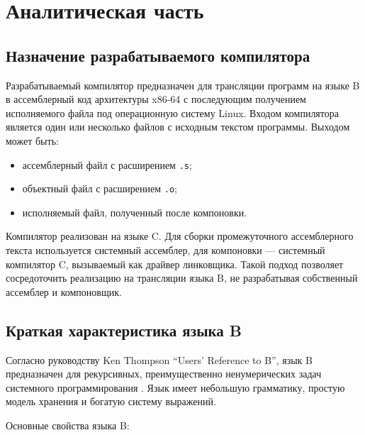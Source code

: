 \chapter{Аналитическая часть}

\section{Назначение разрабатываемого компилятора}

Разрабатываемый компилятор предназначен для трансляции программ на языке B в ассемблерный код архитектуры x86-64 с последующим получением исполняемого файла под операционную систему Linux. Входом компилятора является один или несколько файлов с исходным текстом программы. Выходом может быть:

\begin{itemize}
  \item ассемблерный файл с расширением \texttt{.s};
  \item объектный файл с расширением \texttt{.o};
  \item исполняемый файл, полученный после компоновки.
\end{itemize}

Компилятор реализован на языке C. Для сборки промежуточного ассемблерного текста используется системный ассемблер, для компоновки --- системный компилятор C, вызываемый как драйвер линковщика. Такой подход позволяет сосредоточить реализацию на трансляции языка B, не разрабатывая собственный ассемблер и компоновщик.

\section{Краткая характеристика языка B}

Согласно руководству Ken Thompson ``Users' Reference to B'', язык B предназначен для рекурсивных, преимущественно ненумерических задач системного программирования \cite{bmanual}. Язык имеет небольшую грамматику, простую модель хранения и богатую систему выражений.

Основные свойства языка B:

